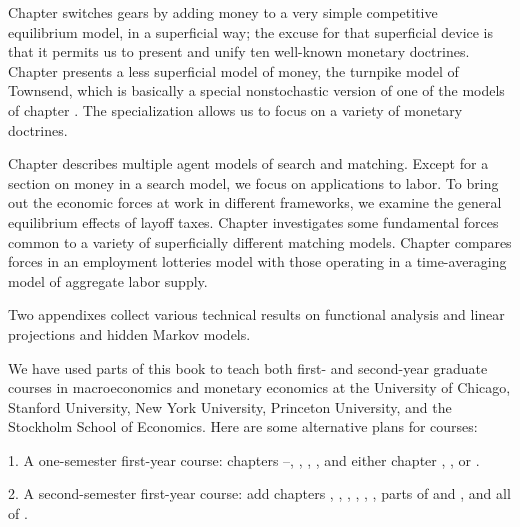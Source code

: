  Chapter  switches
gears by adding money to a very simple competitive
equilibrium model, in a superficial way;  the excuse for
that superficial device      is that it permits us
to present  and unify ten  well-known monetary doctrines.
Chapter  presents a less superficial model of
money, the turnpike model of Townsend,
which is basically a special nonstochastic
version of one of the models of chapter .   The specialization
allows us to focus on a variety of monetary doctrines.

Chapter 
 describes multiple agent models of search and matching. Except
for a section on money in a search model, we  focus  on applications to labor.
 To bring
out the economic forces at work in different frameworks,
we examine the general equilibrium effects of layoff taxes.  Chapter  investigates
some fundamental forces common to a variety of superficially different matching models.   Chapter 
compares forces in an employment lotteries model with those operating in a time-averaging model
of aggregate labor supply.

  Two appendixes
 collect various technical results on
functional analysis and linear projections and hidden Markov models.



 \noindent We have used parts  of  this book to teach both first- and second-year
graduate courses in macroeconomics and monetary economics at the University
of Chicago, Stanford University, New York University, Princeton University, and the
Stockholm School of Economics.  Here are some  alternative plans
for courses:

\medskip
\item{1.} A one-semester first-year course:  chapters
--, , , ,
 and either chapter , , or .

\medskip
\item{2.}  A second-semester first-year course:  add chapters
, , , , ,
,  parts of  and , and all of
.

